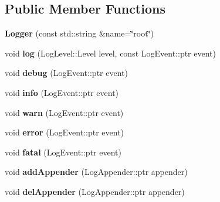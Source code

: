 \subsection*{Public Member Functions}
\begin{DoxyCompactItemize}
\item 
\hypertarget{classsylar_1_1Logger_aedeb6df93457a283ca8685fb9e0ebc06}{{\bfseries Logger} (const std\-::string \&name=\char`\"{}root\char`\"{})}\label{classsylar_1_1Logger_aedeb6df93457a283ca8685fb9e0ebc06}

\item 
\hypertarget{classsylar_1_1Logger_a8fd84a12a6c28a76d972a2053aa42965}{void {\bfseries log} (Log\-Level\-::\-Level level, const Log\-Event\-::ptr event)}\label{classsylar_1_1Logger_a8fd84a12a6c28a76d972a2053aa42965}

\item 
\hypertarget{classsylar_1_1Logger_afd444ae2c8fe2eed75b40f816b9dc13d}{void {\bfseries debug} (Log\-Event\-::ptr event)}\label{classsylar_1_1Logger_afd444ae2c8fe2eed75b40f816b9dc13d}

\item 
\hypertarget{classsylar_1_1Logger_a174c80350e2eb65a122c6dee5b04e138}{void {\bfseries info} (Log\-Event\-::ptr event)}\label{classsylar_1_1Logger_a174c80350e2eb65a122c6dee5b04e138}

\item 
\hypertarget{classsylar_1_1Logger_af7d497a334cfe29f35799a2a36f6222b}{void {\bfseries warn} (Log\-Event\-::ptr event)}\label{classsylar_1_1Logger_af7d497a334cfe29f35799a2a36f6222b}

\item 
\hypertarget{classsylar_1_1Logger_a7c2b57e31bea9635d0ab7265f5d574cb}{void {\bfseries error} (Log\-Event\-::ptr event)}\label{classsylar_1_1Logger_a7c2b57e31bea9635d0ab7265f5d574cb}

\item 
\hypertarget{classsylar_1_1Logger_a349e94ae1b30ac2c7a18bceb7015babc}{void {\bfseries fatal} (Log\-Event\-::ptr event)}\label{classsylar_1_1Logger_a349e94ae1b30ac2c7a18bceb7015babc}

\item 
\hypertarget{classsylar_1_1Logger_ac8879660f7fd549e467084a309f24cd4}{void {\bfseries add\-Appender} (Log\-Appender\-::ptr appender)}\label{classsylar_1_1Logger_ac8879660f7fd549e467084a309f24cd4}

\item 
\hypertarget{classsylar_1_1Logger_a66beed5f8de77a9e4e56767086bca079}{void {\bfseries del\-Appender} (Log\-Appender\-::ptr appender)}\label{classsylar_1_1Logger_a66beed5f8de77a9e4e56767086bca079}


\end{DoxyCompactItemize}
